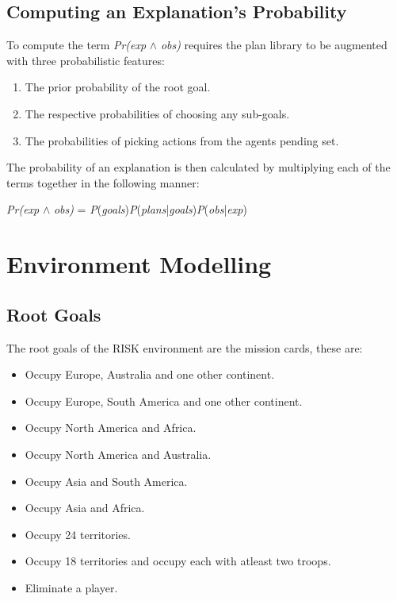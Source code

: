 \documentclass[parskip]{cs4rep}
\begin{document}
\subsection{Computing an Explanation's Probability}

To compute the term \textit{Pr(exp} $\wedge$ \textit{obs)} requires the plan library to be augmented with three probabilistic features:\newline

\begin{enumerate}
\item
The prior probability of the root goal.
\item
The respective probabilities of choosing any sub-goals.
\item
The probabilities of picking actions from the agents pending set.\newline
\end{enumerate}

The probability of an explanation is then calculated by multiplying each of the terms together in the following manner: \newline

\centerline{
\textit{Pr(exp} $\wedge$ \textit{obs)} = \textit{P}(\textit{goals})\textit{P}(\textit{plans}|\textit{goals})\textit{P}(\textit{obs}|\textit{exp})
}

\section{Environment Modelling}

\subsection{Root Goals}

The root goals of the RISK environment are the mission cards, these are:

\begin{itemize}
\item
Occupy Europe, Australia and one other continent.
\item
Occupy Europe, South America and one other continent.
\item
Occupy North America and Africa.
\item
Occupy North America and Australia.
\item
Occupy Asia and South America.
\item
Occupy Asia and Africa.
\item
Occupy 24 territories.
\item
Occupy 18 territories and occupy each with atleast two troops.
\item
Eliminate a player.
\newline
\end{itemize}
\end{document}
